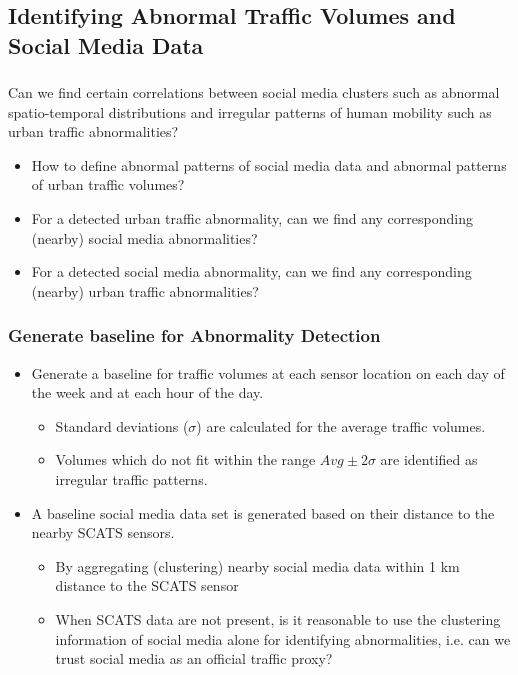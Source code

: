 \subsection{Identifying Abnormal Traffic Volumes and Social Media Data}
\begin{frame}
    \frametitle{}
    Can we find certain correlations between social media clusters such as abnormal spatio-temporal distributions and irregular patterns of human mobility such as urban traffic abnormalities?
    \begin{itemize} \small
        \item How to define abnormal patterns of social media data and abnormal patterns of urban traffic volumes?
        \item For a detected urban traffic abnormality, can we find any corresponding (nearby) social media abnormalities?
        \item For a detected social media abnormality, can we find any corresponding (nearby) urban traffic abnormalities?
    \end{itemize}
\end{frame}

\begin{frame}
    \frametitle{Generate baseline for Abnormality Detection}
    \begin{itemize}
	    \item Generate a baseline for traffic volumes at each sensor location on each day of the week and at each hour of the day.
	    \begin{itemize} \small
	        \item Standard deviations ($\sigma$) are calculated for the average traffic volumes.
	        \item Volumes which do not fit within the range $Avg\pm2\sigma$ are identified as irregular traffic patterns.
	    \end{itemize}
	    \item A baseline social media data set is generated based on their distance to the nearby SCATS sensors.
	    \begin{itemize} \small
	        \item By aggregating (clustering) nearby social media data within 1 km distance to the SCATS sensor
	        \item When SCATS data are not present, is it reasonable to use the clustering information of social media alone for identifying abnormalities, i.e. can we trust social media as an official traffic proxy?
	    \end{itemize}
    \end{itemize}
\end{frame}

